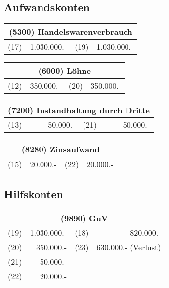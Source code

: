 \documentclass[parskip=half,12pt,a4paper]{scrartcl}
\begin{document}
\subsection{Aufwandskonten}

\begin{center}
	\begin{tabular}{lr|lr}
		\multicolumn{4}{c}{(5300) Handelswarenverbrauch}\\
		\toprule
		(17) & 1.030.000.-& (19) & 1.030.000.-\\
		\bottomrule
	\end{tabular}
\end{center}

\begin{center}
	\begin{tabular}{lr|lr}
		\multicolumn{4}{c}{(6000) Löhne}\\
		\toprule
		(12) & 350.000.-& (20) & 350.000.-\\
		\bottomrule
	\end{tabular}
\end{center}

\begin{center}
	\begin{tabular}{lr|lr}
		\multicolumn{4}{c}{(7200) Instandhaltung durch Dritte}\\
		\toprule
		(13) & 50.000.-& (21) & 50.000.-\\
		\bottomrule
	\end{tabular}
\end{center}

\begin{center}
	\begin{tabular}{lr|lr}
		\multicolumn{4}{c}{(8280) Zinsaufwand}\\
		\toprule
		(15) & 20.000.-& (22) & 20.000.-\\
		\bottomrule
	\end{tabular}
\end{center}

\subsection{Hilfskonten}

\begin{center}
	\begin{tabular}{lr|lr}
		\multicolumn{4}{c}{(9890) GuV}\\
		\toprule
		(19) & 1.030.000.- & (18) & 820.000.-\\
		(20) & 350.000.- & (23) & 630.000.- (Verlust)\\
		(21) & 50.000.- & &\\
		(22) & 20.000.- & &\\
		\bottomrule
	\end{tabular}
\end{center}
\end{document}
